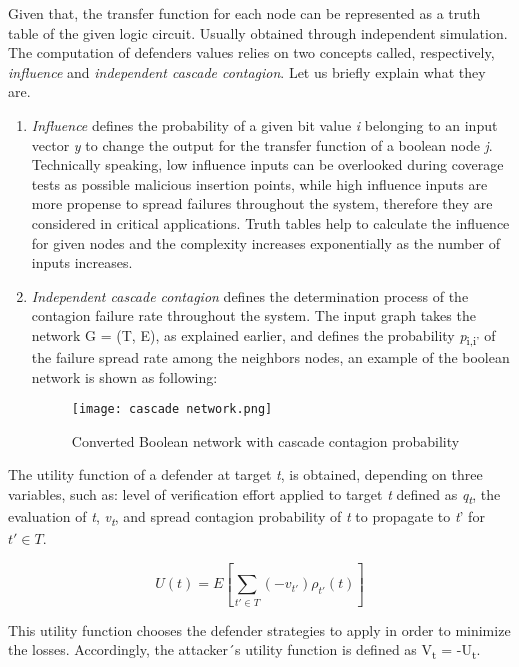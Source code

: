 \documentclass[conference]{IEEEtran}
\begin{document}
Given that, the transfer function for each node can be represented as a truth table of the given logic circuit. Usually obtained through independent simulation. The computation of defenders values relies on two concepts called, respectively, \textit{influence} and \textit{independent cascade contagion}. Let us briefly explain what they are.
\begin{enumerate}
\item \textit{Influence} defines the probability of a given bit value \textit{i} belonging to an input vector \textit{y} to change the output  for the transfer function of a boolean node \textit{j}. Technically speaking, low influence inputs can be overlooked during coverage tests as possible malicious insertion points, while high influence inputs are more propense to spread failures throughout the system, therefore they are considered in critical applications. Truth tables help to calculate the influence for given nodes and the complexity increases exponentially as the number of inputs increases.
\item \textit{Independent cascade contagion} defines the determination process of the contagion failure rate throughout the system. The input graph takes the network G = (T, E), as explained earlier, and defines the probability \textit{p}\textsubscript{i,i'} of the failure spread rate among the neighbors nodes, an example of the boolean network is shown as following:
\begin{figure}[h]
    \centerline{\texttt{[image: cascade network.png]}}
    \caption{Converted Boolean network with cascade contagion probability}
    \label{cascade}
\end{figure} 

\end{enumerate}

The utility function of a defender at target \textit{t}, is obtained, depending on three variables, such as: level of verification effort applied to target \textit{t} defined as \textit{q\textsubscript{t}}, the evaluation of \textit{t}, \textit{v\textsubscript{t}}, and spread contagion probability of \textit{t} to propagate to \textit{t}' for $\textit{t}' \in T$.

\begin{displaymath}
U(t) = E[\sum_{t'\in T}(-v_{t'})\rho_{t'}(t)]
\end{displaymath}


This utility function chooses the defender strategies to apply in order to minimize the losses. Accordingly, the attacker´s utility function is defined as V\textsubscript{t} = -U\textsubscript{t}.
\end{document}
